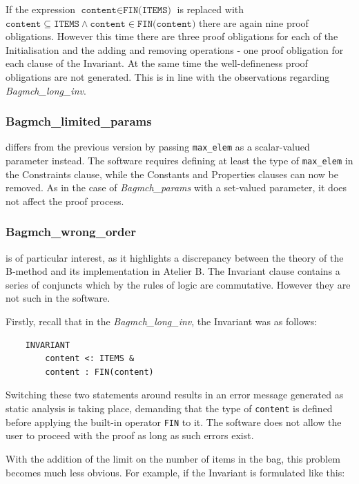 \documentclass[11pt,journal]{IEEEtran}
\begin{document}
	If the expression $\texttt{content} \in \texttt{FIN(ITEMS)}$ is replaced with $\texttt{content} \subseteq \texttt{ITEMS} \wedge \texttt{content} \in \texttt{FIN(content)}$ there are again nine proof obligations. However this time there are three proof obligations for each of the Initialisation and the adding and removing operations - one proof obligation for each clause of the Invariant. At the same time the well-defineness proof obligations are not generated. This is in line with the observations regarding \emph{Bagmch\_long\_inv}.

	\subsubsection{Bagmch\_limited\_params} differs from the previous version by passing \texttt{max\_elem} as a scalar-valued parameter instead. The software requires defining at least the type of \texttt{max\_elem} in the Constraints clause, while the Constants and Properties clauses can now be removed. As in the case of \emph{Bagmch\_params} with a set-valued parameter, it does not affect the proof process.
	
	\subsubsection{Bagmch\_wrong\_order} is of particular interest, as it highlights a discrepancy between the theory of the B-method and its implementation in Atelier B. The Invariant clause contains a series of conjuncts which by the rules of logic are commutative. However they are not such in the software.
	
	Firstly, recall that in the \emph{Bagmch\_long\_inv}, the Invariant was as follows:
	
	\begin{lstlisting}
	INVARIANT
		content <: ITEMS &
		content : FIN(content)
	\end{lstlisting}
	
	Switching these two statements around results in an error message generated as static analysis is taking place, demanding that the type of \texttt{content} is defined before applying the built-in operator \texttt{FIN} to it. The software does not allow the user to proceed with the proof as long as such errors exist.
	
	With the addition of the limit on the number of items in the bag, this problem becomes much less obvious. For example, if the Invariant is formulated like this:
	
\end{document}
